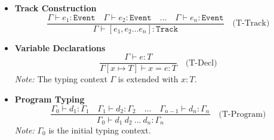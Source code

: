 \documentclass[letterpaper,12pt]{article}
\begin{document}
\begin{itemize}
    \item \textbf{Track Construction}
    \[
    \frac{
        \Gamma \vdash e_1 : \texttt{Event} \quad \Gamma \vdash e_2 : \texttt{Event} \quad \dots \quad \Gamma \vdash e_n : \texttt{Event}
    }{
        \Gamma \vdash [e_1, e_2 \dots e_n] : \texttt{Track}
    } \quad \text{(T-Track)}
    \]
    
    \item \textbf{Variable Declarations}
    \[
    \frac{
        \Gamma \vdash e : T
    }{
        \Gamma[x \mapsto T] \vdash x = e : T
    } \quad \text{(T-Decl)}
    \]
    \emph{Note:} The typing context \(\Gamma\) is extended with \(x : T\).
    
    \item \textbf{Program Typing}
    \[
    \frac{
        \Gamma_0 \vdash d_1 : \Gamma_1 \quad \Gamma_1 \vdash d_2 : \Gamma_2 \quad \dots \quad \Gamma_{n-1} \vdash d_n : \Gamma_n
    }{
        \Gamma_0 \vdash d_1 \ d_2 \ \dots \ d_n : \Gamma_n
    } \quad \text{(T-Program)}
    \]
    \emph{Note:} \(\Gamma_0\) is the initial typing context.
    

\end{itemize}
\end{document}
